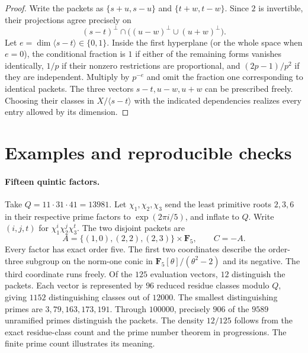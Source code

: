 \documentclass[11pt,letterpaper]{article}
\theoremstyle{remark}
\begin{document}
\begin{proof}
Write the packets as $\{s+u,s-u\}$ and $\{t+w,t-w\}$. Since $2$ is
invertible, their projections agree precisely on
\[
 (s-t)^\perp\cap\big((u-w)^\perp\cup(u+w)^\perp\big).
\]
Let $e=\dim\langle s-t\rangle\in\{0,1\}$. Inside the first hyperplane
(or the whole space when $e=0$), the conditional fraction is $1$
if either of the remaining forms vanishes identically, $1/p$ if their
nonzero restrictions are proportional, and $(2p-1)/p^2$ if they
are independent. Multiply by $p^{-e}$ and omit the fraction one
corresponding to identical packets. The three vectors
$s-t,u-w,u+w$ can be prescribed freely. Choosing their classes in
$X/\langle s-t\rangle$ with the indicated dependencies realizes
every entry allowed by its dimension.
\end{proof}

\section{Examples and reproducible checks}

\paragraph{Fifteen quintic factors.}
Take $Q=11\cdot31\cdot41=13981$. Let $\chi_1,\chi_2,\chi_3$ send the
least primitive roots $2,3,6$ in their respective prime factors to
$\exp(2\pi i/5)$, and inflate to $Q$. Write $(i,j,t)$ for
$\chi_1^i\chi_2^j\chi_3^t$. The two disjoint packets are
\[
 A=\{(1,0),(2,2),(2,3)\}\times\mathbf F_5,
 \qquad C=-A .
\]
Every factor has exact order five.
The first two coordinates describe the order-three subgroup on the
norm-one conic in $\mathbf F_5[\theta]/(\theta^2-2)$ and its negative.
The third coordinate runs freely. Of the $125$ evaluation vectors,
$12$ distinguish the packets. Each vector is represented by $96$
reduced residue classes modulo $Q$, giving $1152$ distinguishing
classes out of $12000$. The smallest distinguishing primes are
$3,79,163,173,191$. Through $100000$, precisely $906$ of the $9589$
unramified primes distinguish the packets. The density $12/125$ follows
from the exact residue-class count and the prime number theorem in
progressions. The finite prime count illustrates its meaning.
\end{document}
